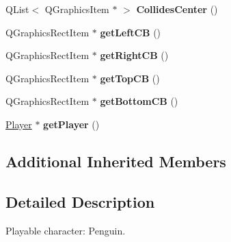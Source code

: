 \begin{DoxyCompactItemize}
\item 
\hypertarget{class_pingouin_a10126ab2598c56da1fe96bae1bedf9a7}{}Q\+List$<$ Q\+Graphics\+Item $\ast$ $>$ {\bfseries Collides\+Center} ()\label{class_pingouin_a10126ab2598c56da1fe96bae1bedf9a7}

\item 
\hypertarget{class_pingouin_aaa130c988fb99be84ae8ce057ff0466f}{}Q\+Graphics\+Rect\+Item $\ast$ {\bfseries get\+Left\+C\+B} ()\label{class_pingouin_aaa130c988fb99be84ae8ce057ff0466f}

\item 
\hypertarget{class_pingouin_a840603a098f62619f3cf6aef3ff71500}{}Q\+Graphics\+Rect\+Item $\ast$ {\bfseries get\+Right\+C\+B} ()\label{class_pingouin_a840603a098f62619f3cf6aef3ff71500}

\item 
\hypertarget{class_pingouin_a04bb88b6251aa853e1980c35005f7df8}{}Q\+Graphics\+Rect\+Item $\ast$ {\bfseries get\+Top\+C\+B} ()\label{class_pingouin_a04bb88b6251aa853e1980c35005f7df8}

\item 
\hypertarget{class_pingouin_aafa634e4ec962a442b5a4fdf1d029464}{}Q\+Graphics\+Rect\+Item $\ast$ {\bfseries get\+Bottom\+C\+B} ()\label{class_pingouin_aafa634e4ec962a442b5a4fdf1d029464}

\item 
\hypertarget{class_pingouin_ae8bf1799a91f7c7863731ddcfe1b1418}{}\hyperlink{class_player}{Player} $\ast$ {\bfseries get\+Player} ()\label{class_pingouin_ae8bf1799a91f7c7863731ddcfe1b1418}

\end{DoxyCompactItemize}
\subsection*{Additional Inherited Members}


\subsection{Detailed Description}
Playable character\+: Penguin. 

